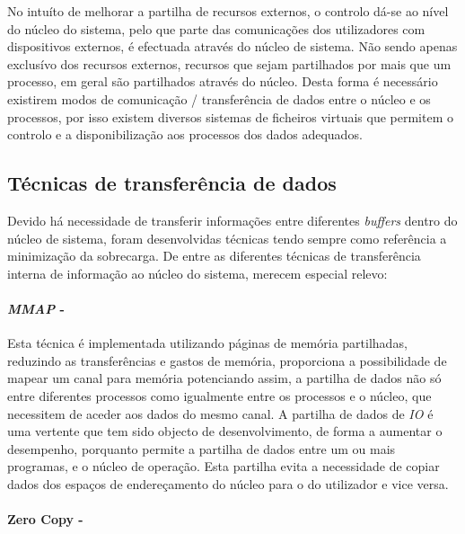 No intuíto de melhorar a partilha de recursos externos, o controlo dá-se ao nível do núcleo do sistema, pelo que parte das comunicações dos utilizadores com dispositivos externos, é efectuada através do núcleo de sistema.
Não sendo apenas exclusívo dos recursos externos, recursos que sejam partilhados por mais que um processo, em geral são partilhados através do núcleo.
Desta forma é necessário existirem modos de comunicação / transferência de dados entre o núcleo e os processos, por isso existem diversos sistemas de ficheiros virtuais que permitem o controlo e a disponibilização aos processos dos dados adequados.

\subsection{Técnicas de transferência de dados}

Devido há necessidade de transferir informações entre diferentes \textit{buffers} dentro do núcleo de sistema, foram desenvolvidas técnicas tendo sempre como referência a minimização da sobrecarga.
De entre as diferentes técnicas de transferência interna de informação ao núcleo do sistema, merecem especial relevo:

\paragraph*{\textit{MMAP} - }

Esta técnica é implementada utilizando páginas de memória partilhadas, reduzindo as transferências e gastos de memória, proporciona a possibilidade de mapear um canal para memória potenciando assim, a partilha de dados não só entre diferentes processos como igualmente entre os processos e o núcleo, que necessitem de aceder aos dados do mesmo canal.
A partilha de dados de \textit{IO} é uma vertente que tem sido objecto de desenvolvimento, de forma a aumentar o desempenho, porquanto permite a partilha de dados entre um ou mais programas, e o núcleo de operação.
Esta partilha evita a necessidade de copiar dados dos espaços de endereçamento do núcleo para o do utilizador e vice versa.

\paragraph*{Zero Copy - }

